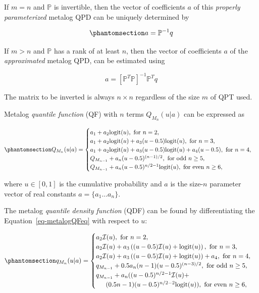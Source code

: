 \documentclass[
]{interact}
\begin{document}
If \(m=n\) and \(\mathbb{P}\) is invertible, then the vector of
coefficients \(a\) of this \emph{properly parameterized} metalog QPD can
be uniquely determined by

\begin{equation}\phantomsection\label{eq-nmetalogAsMatrixeq}{
a=\mathbb{P}^{-1}q
}\end{equation}

If \(m > n\) and \(\mathbb{P}\) has a rank of at least \(n\), then the
vector of coefficients \(a\) of the \emph{approximated} metalog QPD, can
be estimated using

\[
a=[\mathbb{P}^T\mathbb{P}]^{-1}\mathbb{P}^Tq
\]

The matrix to be inverted is always \(n \times n\) regardless of the
size \(m\) of QPT used.

Metalog \emph{quantile function} (QF) with \(n\) terms
\(Q_{M_n}(u\vert a)\) can be expressed as

\begin{equation}\phantomsection\label{eq-metalogQFeq}{
Q_{M_n}(u\vert a)=\begin{cases}
a_1+a_2\text{logit}(u), \text{ for } n=2, \\
a_1+a_2\text{logit}(u)+a_3(u-0.5)\text{logit}(u), \text{ for } n=3, \\
a_1+a_2\text{logit}(u)+a_3(u-0.5)\text{logit}(u)+a_4(u-0.5), \text{ for } n=4, \\
Q_{M_{n-1}} + a_n(u-0.5)^{(n-1)/2}, \text{ for odd } n \geq 5, \\
Q_{M_{n-1}} + a_n(u-0.5)^{n/2-1}\text{logit}(u), \text{ for even } n \geq 6, \\
\end{cases}
}\end{equation}

where \(u \in [0,1]\) is the cumulative probability and \(a\) is the
size-\(n\) parameter vector of real constants \(a=\{a_1\dots a_n\}\).

The metalog \emph{quantile density function} (QDF) can be found by
differentiating the Equation~\ref{eq-metalogQFeq} with respect to \(u\):

\begin{equation}\phantomsection\label{eq-metalogQDFeq}{
\begin{gathered}
q_{M_n}(u\vert a)=\begin{cases}
a_2\mathcal I(u), \text{ for } n=2, \\
a_2\mathcal I(u)+a_3\left((u-0.5)\mathcal I(u)+\text{logit}(u) \right), \text{ for } n=3, \\
a_2\mathcal I(u) + a_3\left((u-0.5)\mathcal I(u)+\text{logit}(u) \right)+ a_4,  \text{ for } n=4, \\
q_{M_{n-1}} + 0.5a_n(n-1)(u-0.5)^{(n-3)/2}, \text{ for odd } n \geq 5, \\
q_{M_{n-1}} + a_n((u-0.5)^{n/2-1}\mathcal I(u)+\\ \indent (0.5n-1)(u-0.5)^{n/2-2}\text{logit}(u)), \text{ for even } n \geq 6, \\
\end{cases}
\end{gathered}
}\end{equation}
\end{document}
